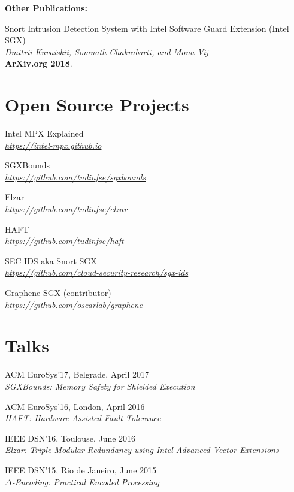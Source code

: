 \documentclass[letterpaper]{article}
\renewenvironment{itemize}{
  \begin{list}{}{
    \setlength{\leftmargin}{1.5em}
  }
}{
  \end{list}
}
\begin{document}

{\bf Other Publications:}

\begin{itemize}

\item{Snort Intrusion Detection System with Intel Software Guard Extension (Intel SGX)}\\
{\em Dmitrii Kuvaiskii, Somnath Chakrabarti, and Mona Vij}\\
{\bf ArXiv.org 2018}.

\end{itemize}

\section*{Open Source Projects}
\begin{itemize}
\item Intel MPX Explained\\
{\em \href{https://intel-mpx.github.io}{https://intel-mpx.github.io}}
\item SGXBounds\\
{\em \href{https://github.com/tudinfse/sgxbounds}{https://github.com/tudinfse/sgxbounds}}
\item Elzar\\
{\em \href{https://github.com/tudinfse/elzar}{https://github.com/tudinfse/elzar}}
\item HAFT\\
{\em \href{https://github.com/tudinfse/haft}{https://github.com/tudinfse/haft}}
\item SEC-IDS aka Snort-SGX\\
{\em \href{https://github.com/cloud-security-research/sgx-ids}{https://github.com/cloud-security-research/sgx-ids}}
\item Graphene-SGX (contributor)\\
{\em \href{https://github.com/oscarlab/graphene}{https://github.com/oscarlab/graphene}}
\end{itemize}



\section*{Talks}
\begin{itemize}
\item ACM EuroSys'17, Belgrade, April 2017\\
{\em  SGXBounds: Memory Safety for Shielded Execution}
\item ACM EuroSys'16, London, April 2016\\
	{\em  HAFT: Hardware-Assisted Fault Tolerance}
\item IEEE DSN'16, Toulouse, June 2016\\
	{\em  Elzar: Triple Modular Redundancy using Intel Advanced Vector Extensions}
\item IEEE DSN'15, Rio de Janeiro, June 2015\\
{\em  $\Delta$-Encoding: Practical Encoded Processing}
\end{itemize}
\end{document}
